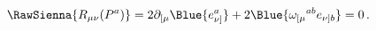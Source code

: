 \begin{equation}
  \RawSienna{R_{\mu \nu }(P^a)}=2\partial_{[\mu}
\Blue{e_{\nu]}^a}+2\Blue{\omega_{[\mu}{}^{ab}e_{\nu] b}}=0\,.
 \label{constrRP}
\end{equation}

